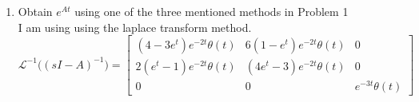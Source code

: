 \begin{enumerate}
  \item Obtain $e^{At}$ using one of the three mentioned methods in Problem 1 \\
    I am using using the laplace transform method.
    \begin{equation}
\mathscr{L}^{-1}\Big ((sI-A)^{-1}\Big ) = \left[\begin{matrix}\left(4 - 3 e^{t}\right) e^{- 2 t} \theta\left(t\right) & 6 \left(1 - e^{t}\right) e^{- 2 t} \theta\left(t\right) & 0\\2 \left(e^{t} - 1\right) e^{- 2 t} \theta\left(t\right) & \left(4 e^{t} - 3\right) e^{- 2 t} \theta\left(t\right) & 0\\0 & 0 & e^{- 3 t} \theta\left(t\right)\end{matrix}\right]\end{equation}

  \end{enumerate}